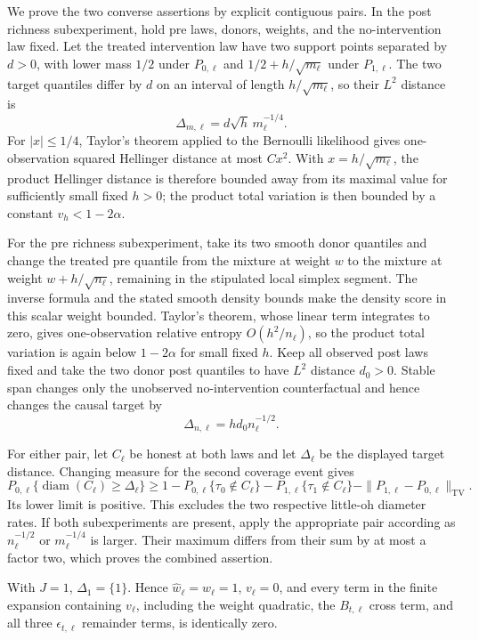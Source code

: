 We prove the two converse assertions by explicit contiguous pairs.  In the post richness subexperiment, hold pre laws, donors, weights, and the no-intervention law fixed.  Let the treated intervention law have two support points separated by \(d>0\), with lower mass \(1/2\) under \(P_{0,\ell}\) and \(1/2+h/\sqrt{m_\ell}\) under \(P_{1,\ell}\).  The two target quantiles differ by \(d\) on an interval of length \(h/\sqrt{m_\ell}\), so their \(L^2\) distance is
\[
 \Delta_{m,\ell}=d\sqrt h\,m_\ell^{-1/4}.
\]
For \(|x|\leq1/4\), Taylor's theorem applied to the Bernoulli likelihood gives one-observation squared Hellinger distance at most \(C x^2\).  With \(x=h/\sqrt{m_\ell}\), the product Hellinger distance is therefore bounded away from its maximal value for sufficiently small fixed \(h>0\); the product total variation is then bounded by a constant \(v_h<1-2\alpha\).

For the pre richness subexperiment, take its two smooth donor quantiles and change the treated pre quantile from the mixture at weight \(w\) to the mixture at weight \(w+h/\sqrt{n_\ell}\), remaining in the stipulated local simplex segment.  The inverse formula and the stated smooth density bounds make the density score in this scalar weight bounded.  Taylor's theorem, whose linear term integrates to zero, gives one-observation relative entropy \(O(h^2/n_\ell)\), so the product total variation is again below \(1-2\alpha\) for small fixed \(h\).  Keep all observed post laws fixed and take the two donor post quantiles to have \(L^2\) distance \(d_0>0\).  Stable span changes only the unobserved no-intervention counterfactual and hence changes the causal target by
\[
 \Delta_{n,\ell}=h d_0n_\ell^{-1/2}.
\]

For either pair, let \(C_\ell\) be honest at both laws and let \(\Delta_\ell\) be the displayed target distance.  Changing measure for the second coverage event gives
\[
 P_{0,\ell}\{\operatorname{diam}(C_\ell)\geq\Delta_\ell\}
 \geq1-P_{0,\ell}\{\tau_0\notin C_\ell\}
       -P_{1,\ell}\{\tau_1\notin C_\ell\}
       -\|P_{1,\ell}-P_{0,\ell}\|_{\mathrm{TV}}.
\]
Its lower limit is positive.  This excludes the two respective little-oh diameter rates.  If both subexperiments are present, apply the appropriate pair according as \(n_\ell^{-1/2}\) or \(m_\ell^{-1/4}\) is larger.  Their maximum differs from their sum by at most a factor two, which proves the combined assertion.

With \(J=1\), \(\Delta_1=\{1\}\).  Hence \(\widehat w_\ell=w_\ell=1\), \(v_\ell=0\), and every term in the finite expansion containing \(v_\ell\), including the weight quadratic, the \(B_{t,\ell}\) cross term, and all three \(\epsilon_{t,\ell}\) remainder terms, is identically zero.

